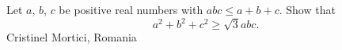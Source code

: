Let $a$,  $b$,  $c$ be positive real numbers with $abc \leq a+b+c$. Show that \[ a^2 + b^2 + c^2 \geq \sqrt 3 abc. \]Cristinel Mortici, Romania